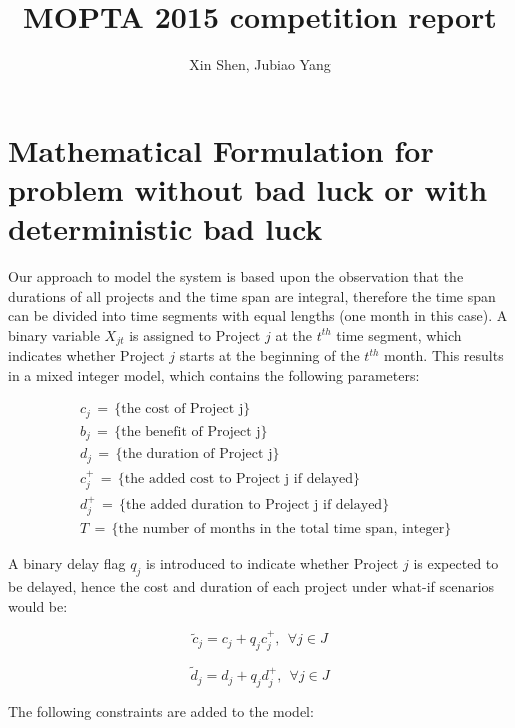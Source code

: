 \documentclass[final,3p,times]{elsarticle}
\begin{document}
\begin{frontmatter}

\title{MOPTA 2015 competition report}

\author{Xin Shen, Jubiao Yang}
\end{frontmatter}

\section{Mathematical Formulation for problem without bad luck or with deterministic bad luck}
	Our approach to model the system is based upon the observation that the durations of all projects and the time span are integral, therefore the time span can be divided into time segments with equal lengths (one month in this case). A binary variable $X_{jt}$ is assigned to Project $j$ at the $t^{th}$ time segment, which indicates whether Project $j$ starts at the beginning of the $t^{th}$ month. This results in a mixed integer model, which contains the following parameters:

	\begin{align*}
		&c_j\,=\, \{\mbox{the cost of Project j}\}\\
		&b_j\,=\, \{\mbox{the benefit of Project j}\}\\
		&d_j\,=\, \{\mbox{the duration of Project j}\}\\
		&c^+_j\,=\, \{\mbox{the added cost to Project j if delayed}\}\\
		&d^+_j\,=\, \{\mbox{the added duration to Project j if delayed}\}\\
		&T \,=\, \{\mbox{the number of months in the total time span, integer}\}
	\end{align*}
	
	A binary delay flag $q_j$ is introduced to indicate whether Project $j$ is expected to be delayed, hence the cost and duration of each project under what-if scenarios would be:
	
	\begin{equation}
		\tilde{c}_j = c_j + q_j c^+_j,~~\forall j \in J
	\end{equation}
	
	\begin{equation}
		\tilde{d}_j = d_j + q_j d^+_j,~~\forall j \in J
	\end{equation}

	The following constraints are added to the model:
	
\end{document}

